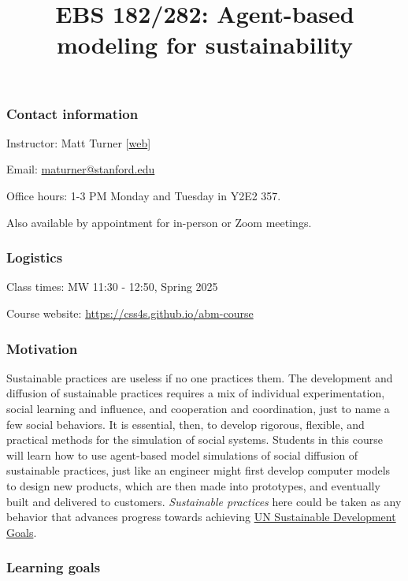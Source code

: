 \documentclass[
  letterpaper,
  DIV=11,
  numbers=noendperiod]{scrartcl}
\title{EBS 182/282: Agent-based modeling for sustainability}
\author{}
\date{}
\begin{document}
\maketitle


\subsubsection{Contact information}\label{contact-information}

Instructor: Matt Turner {[}\href{https://mt.digital}{web}{]}

Email: \url{maturner@stanford.edu}

Office hours: 1-3 PM Monday and Tuesday in Y2E2 357.

Also available by appointment for in-person or Zoom meetings.

\subsubsection{Logistics}\label{logistics}

Class times: MW 11:30 - 12:50, Spring 2025

Course website: \url{https://css4s.github.io/abm-course}

\subsubsection{Motivation}\label{motivation}

Sustainable practices are useless if no one practices them. The
development and diffusion of sustainable practices requires a mix of
individual experimentation, social learning and influence, and
cooperation and coordination, just to name a few social behaviors. It is
essential, then, to develop rigorous, flexible, and practical methods
for the simulation of social systems. Students in this course will learn
how to use agent-based model simulations of social diffusion of
sustainable practices, just like an engineer might first develop
computer models to design new products, which are then made into
prototypes, and eventually built and delivered to customers.
\emph{Sustainable practices} here could be taken as any behavior that
advances progress towards achieving \href{https://sdgs.un.org/goals}{UN
Sustainable Development Goals}.

\subsubsection{Learning goals}\label{learning-goals}
\end{document}
